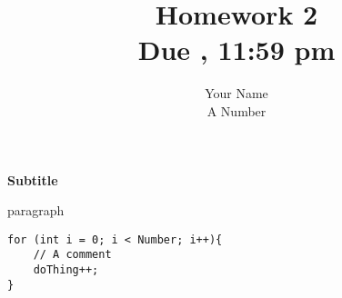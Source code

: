 \documentclass[]{exam}
\title{Homework 2\\
	Due \DTMdate{2021-2-1}, 11:59 pm\\
}
\author{Your Name\\ 
A Number
}
\begin{document}
\maketitle

\textbf{Subtitle} \par
\vspace{10pt}

paragraph

\begin{lstlisting}
for (int i = 0; i < Number; i++){
    // A comment
    doThing++;
}
\end{lstlisting}
\end{document}
